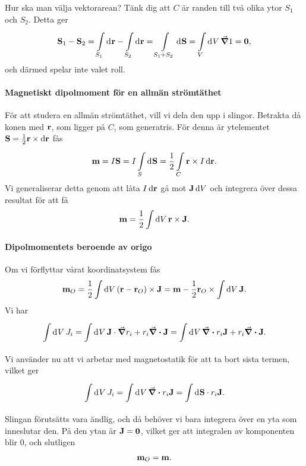 Hur ska man välja vektorarean? Tänk dig att $C$ är randen till två olika ytor $S_{1}$ och $S_{2}$. Detta ger
\begin{align*}
	\vb{S}_{1} - \vb{S}_{2} = \int\limits_{S_{1}}^{}\dd[]{\vb{r}} - \int\limits_{S_{2}}^{}\dd[]{\vb{r}} = \int\limits_{S_{1} + S_{2}}^{}\dd[]{\vb{S}} = \int\limits_{V}^{}\dd[]{V}\grad{1} = \vb{0},
\end{align*}
och därmed spelar inte valet roll.

\paragraph{Magnetiskt dipolmoment för en allmän strömtäthet}
För att studera en allmän strömtäthet, vill vi dela den upp i slingor. Betrakta då konen med $\vb{r}$, som ligger på $C$, som generatris. För denna är ytelementet $\vb{S} = \frac{1}{2}\vb{r}\times\dd{\vb{r}}$ fås
\begin{align*}
	\vb{m} = I\vb{S} = I\int\limits_{S}^{}\dd[]{\vb{S}} = \frac{1}{2}\int\limits_{C}{\vb{r}\times I\dd{\vb{r}}}.
\end{align*}
Vi generaliserar detta genom att låta $I\dd{\vb{r}}$ gå mot $\vb{J}\dd{V}$ och integrera över dessa resultat för att få
\begin{align*}
	\vb{m} = \frac{1}{2}\int{\dd{V}\vb{r}\times \vb{J}}.
\end{align*}

\paragraph{Dipolmomentets beroende av origo}
Om vi förflyttar vårat koordinatsystem fås
\begin{align*}
	\vb{m}_{O} = \frac{1}{2}\int{\dd{V}(\vb{r} - \vb{r}_{O})\times \vb{J}} = \vb{m} - \frac{1}{2}\vb{r}_{O}\times\int{\dd{V}\vb{J}}.
\end{align*}
Vi har
\begin{align*}
	\int\limits_{}^{}\dd[]{V}J_{i} = \int\limits_{}^{}\dd[]{V}\vb{J}\cdot\grad{r_{i}} + r_{i}\div{\vb{J}} = \int\limits_{}^{}\dd[]{V}\div{r_{i}\vb{J}} + r_{i}\div{\vb{J}}.
\end{align*}
Vi använder nu att vi arbetar med magnetostatik för att ta bort sista termen, vilket ger
\begin{align*}
	\int\limits_{}^{}\dd[]{V}J_{i} = \int\limits_{}^{}\dd[]{V}\div{r_{i}\vb{J}} = \int\limits_{}^{}\dd[]{\vb{S}}\cdot r_{i}\vb{J}.
\end{align*}
Slingan förutsätts vara ändlig, och då behöver vi bara integrera över en yta som inneslutar den. På den ytan är $\vb{J} = \vb{0}$, vilket ger att integralen av komponenten blir $0$, och slutligen
\begin{align*}
	\vb{m}_{O} = \vb{m}.
\end{align*}

